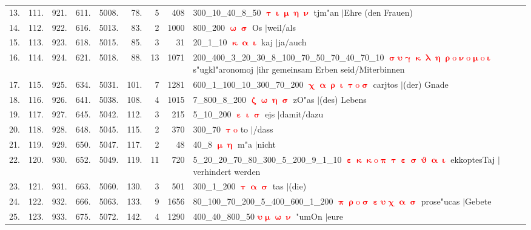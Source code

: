 \documentclass[a4paper,10pt,landscape]{article}
\begin{document}
\begin{tabular}{rrrrrrrrp{120mm}}
13.&111.&921.&611.&5008.&78.&5&408&300\_10\_40\_8\_50 \textcolor{red}{$\boldsymbol{\uptau\upiota\upmu\upeta\upnu}$} tjm"an $|$Ehre (den Frauen)\\
14.&112.&922.&616.&5013.&83.&2&1000&800\_200 \textcolor{red}{$\boldsymbol{\upomega\upsigma}$} Os $|$weil/als\\
15.&113.&923.&618.&5015.&85.&3&31&20\_1\_10 \textcolor{red}{$\boldsymbol{\upkappa\upalpha\upiota}$} kaj $|$ja/auch\\
16.&114.&924.&621.&5018.&88.&13&1071&200\_400\_3\_20\_30\_8\_100\_70\_50\_70\_40\_70\_10 \textcolor{red}{$\boldsymbol{\upsigma\upsilon\upgamma\upkappa\uplambda\upeta\uprho\mathrm{o}\upnu\mathrm{o}\upmu\mathrm{o}\upiota}$} s"ugkl"aronomoj $|$ihr gemeinsam Erben seid/Miterbinnen\\
17.&115.&925.&634.&5031.&101.&7&1281&600\_1\_100\_10\_300\_70\_200 \textcolor{red}{$\boldsymbol{\upchi\upalpha\uprho\upiota\uptau\mathrm{o}\upsigma}$} carjtos $|$(der) Gnade\\
18.&116.&926.&641.&5038.&108.&4&1015&7\_800\_8\_200 \textcolor{red}{$\boldsymbol{\upzeta\upomega\upeta\upsigma}$} zO"as $|$(des) Lebens\\
19.&117.&927.&645.&5042.&112.&3&215&5\_10\_200 \textcolor{red}{$\boldsymbol{\upepsilon\upiota\upsigma}$} ejs $|$damit/dazu\\
20.&118.&928.&648.&5045.&115.&2&370&300\_70 \textcolor{red}{$\boldsymbol{\uptau\mathrm{o}}$} to $|$/dass\\
21.&119.&929.&650.&5047.&117.&2&48&40\_8 \textcolor{red}{$\boldsymbol{\upmu\upeta}$} m"a $|$nicht\\
22.&120.&930.&652.&5049.&119.&11&720&5\_20\_20\_70\_80\_300\_5\_200\_9\_1\_10 \textcolor{red}{$\boldsymbol{\upepsilon\upkappa\upkappa\mathrm{o}\uppi\uptau\upepsilon\upsigma\upvartheta\upalpha\upiota}$} ekkoptesTaj $|$verhindert werden\\
23.&121.&931.&663.&5060.&130.&3&501&300\_1\_200 \textcolor{red}{$\boldsymbol{\uptau\upalpha\upsigma}$} tas $|$(die)\\
24.&122.&932.&666.&5063.&133.&9&1656&80\_100\_70\_200\_5\_400\_600\_1\_200 \textcolor{red}{$\boldsymbol{\uppi\uprho\mathrm{o}\upsigma\upepsilon\upsilon\upchi\upalpha\upsigma}$} prose"ucas $|$Gebete\\
25.&123.&933.&675.&5072.&142.&4&1290&400\_40\_800\_50 \textcolor{red}{$\boldsymbol{\upsilon\upmu\upomega\upnu}$} "umOn $|$eure\\
\end{tabular}\medskip \\
\end{document}
